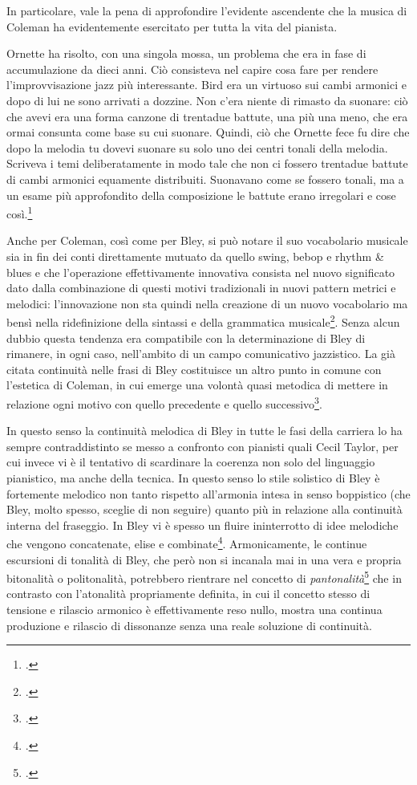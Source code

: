 In particolare, vale la pena di approfondire l'evidente ascendente che la musica di Coleman ha evidentemente esercitato per tutta la vita del pianista.
\begin{fquote}
	Ornette ha risolto, con una singola mossa, un problema che era in fase di accumulazione da dieci anni. Ciò consisteva nel capire cosa fare per rendere l'improvvisazione jazz più interessante. Bird era un virtuoso sui cambi armonici e dopo di lui ne sono arrivati a dozzine. Non c'era niente di rimasto da suonare: ciò che avevi era una forma canzone di trentadue battute, una più una meno, che era ormai consunta come base su cui suonare. Quindi, ciò che Ornette fece fu dire che dopo la melodia tu dovevi suonare su solo uno dei centri tonali della melodia. Scriveva i temi deliberatamente in modo tale che non ci fossero trentadue battute di cambi armonici equamente distribuiti. Suonavano come se fossero tonali, ma a un esame più approfondito della composizione le battute erano irregolari e cose così.\footcite[12]{downbeat74}
\end{fquote}
Anche per Coleman, così come per Bley, si può notare il suo vocabolario musicale sia in fin dei conti direttamente mutuato da quello swing, bebop e rhythm \& blues e che l'operazione effettivamente innovativa consista nel nuovo significato dato dalla combinazione di questi motivi tradizionali in nuovi pattern metrici e melodici: l'innovazione non sta quindi nella creazione di un nuovo vocabolario ma bensì nella ridefinizione della sintassi e della grammatica musicale\footcite[109]{cogswell}. Senza alcun dubbio questa tendenza era compatibile con la determinazione di Bley di rimanere, in ogni caso, nell'ambito di un campo comunicativo jazzistico. La già citata continuità nelle frasi di Bley costituisce un altro punto in comune con l'estetica di Coleman, in cui emerge una volontà quasi metodica di mettere in relazione ogni motivo con quello precedente e quello successivo\footcite[115]{cogswell}.\par
In questo senso la continuità melodica di Bley in tutte le fasi della carriera lo ha sempre contraddistinto se messo a confronto con pianisti quali Cecil Taylor, per cui invece vi è il tentativo di scardinare la coerenza non solo del linguaggio pianistico, ma anche della tecnica. In questo senso lo stile solistico di Bley è fortemente melodico non tanto rispetto all'armonia intesa in senso boppistico (che Bley, molto spesso, sceglie di non seguire) quanto più in relazione alla continuità interna del fraseggio. In Bley vi è spesso un fluire ininterrotto di idee melodiche che vengono concatenate, elise e combinate\footcite[20]{meehan}. Armonicamente, le continue escursioni di tonalità di Bley, che però non si incanala mai in una vera e propria bitonalità o politonalità, potrebbero rientrare nel concetto di \textit{pantonalità}\footcite[73]{reti} che in contrasto con l'atonalità propriamente definita, in cui il concetto stesso di tensione e rilascio armonico è effettivamente reso nullo, mostra una continua produzione e rilascio di dissonanze senza una reale soluzione di continuità.\par
